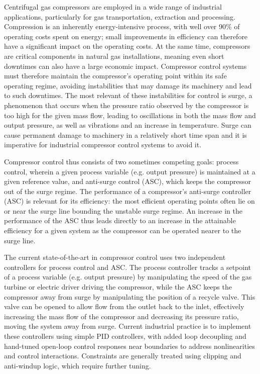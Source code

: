 Centrifugal gas compressors are employed in a wide range of industrial applications, particularly for gas transportation, extraction and processing.
Compression is an inherently energy-intensive process, with well over 90\% of operating costs spent on energy; small improvements in efficiency can therefore have a significant impact on the operating costs.
At the same time, compressors are critical components in natural gas installations, meaning even short downtimes can also have a large economic impact.
Compressor control systems must therefore maintain the compressor's operating point within its safe operating regime, avoiding instabilities that may damage its machinery and lead to such downtimes.
The most relevant of these instabilities for control is surge, a phenomenon that occurs when the pressure ratio observed by the compressor is too high for the given mass flow, leading to oscillations in both the mass flow and output pressure, as well as vibrations and an increase in temperature.
Surge can cause permanent damage to machinery in a relatively short time span and it is imperative for industrial compressor control systems to avoid it.

Compressor control thus consists of two sometimes competing goals: process control, wherein a given process variable (e.g. output pressure) is maintained at a given reference value, and anti-surge control (ASC), which keeps the compressor out of the surge regime.
The performance of a compressor's anti-surge controller (ASC) is relevant for its efficiency: the most efficient operating points often lie on or near the surge line bounding the unstable surge regime.
An increase in the performance of the ASC thus leads directly to an increase in the attainable efficiency for a given system as the compressor can be operated nearer to the surge line.

The current state-of-the-art in compressor control uses two independent controllers for process control and ASC.
The process controller tracks a setpoint of a process variable (e.g. output pressure) by manipulating the speed of the gas turbine or electric driver driving the compressor, while the ASC keeps the compressor away from surge by manipulating the position of a recycle valve.
This valve can be opened to allow flow from the outlet back to the inlet, effectively increasing the mass flow of the compressor and decreasing its pressure ratio, moving the system away from surge.
Current industrial practice is to implement these controllers using simple PID controllers, with added loop decoupling and hand-tuned open-loop control responses near boundaries to address nonlinearities and control interactions.
Constraints are generally treated using clipping and anti-windup logic, which require further tuning.

